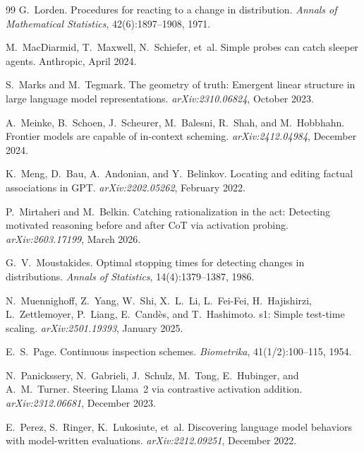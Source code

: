 \documentclass[11pt]{article}
\theoremstyle{definition}
\newcommand{\1}{\mathbf{1}}
\begin{document}
\begin{thebibliography}{99}
G.~Lorden.
\newblock Procedures for reacting to a change in distribution.
\newblock \emph{Annals of Mathematical Statistics}, 42(6):1897--1908, 1971.

M.~MacDiarmid, T.~Maxwell, N.~Schiefer, et~al.
\newblock Simple probes can catch sleeper agents.
\newblock Anthropic, April 2024.

S.~Marks and M.~Tegmark.
\newblock The geometry of truth: Emergent linear structure in large language model representations.
\newblock \emph{arXiv:2310.06824}, October 2023.

A.~Meinke, B.~Schoen, J.~Scheurer, M.~Balesni, R.~Shah, and M.~Hobbhahn.
\newblock Frontier models are capable of in-context scheming.
\newblock \emph{arXiv:2412.04984}, December 2024.

K.~Meng, D.~Bau, A.~Andonian, and Y.~Belinkov.
\newblock Locating and editing factual associations in GPT.
\newblock \emph{arXiv:2202.05262}, February 2022.

P.~Mirtaheri and M.~Belkin.
\newblock Catching rationalization in the act: Detecting motivated reasoning before and after CoT via activation probing.
\newblock \emph{arXiv:2603.17199}, March 2026.

G.~V.~Moustakides.
\newblock Optimal stopping times for detecting changes in distributions.
\newblock \emph{Annals of Statistics}, 14(4):1379--1387, 1986.

N.~Muennighoff, Z.~Yang, W.~Shi, X.~L.~Li, L.~Fei-Fei, H.~Hajishirzi, L.~Zettlemoyer, P.~Liang, E.~Cand\`es, and T.~Hashimoto.
\newblock s1: Simple test-time scaling.
\newblock \emph{arXiv:2501.19393}, January 2025.

E.~S.~Page.
\newblock Continuous inspection schemes.
\newblock \emph{Biometrika}, 41(1/2):100--115, 1954.

N.~Panickssery, N.~Gabrieli, J.~Schulz, M.~Tong, E.~Hubinger, and A.~M.~Turner.
\newblock Steering Llama~2 via contrastive activation addition.
\newblock \emph{arXiv:2312.06681}, December 2023.

E.~Perez, S.~Ringer, K.~Lukosiute, et~al.
\newblock Discovering language model behaviors with model-written evaluations.
\newblock \emph{arXiv:2212.09251}, December 2022.


\end{thebibliography}
\end{document}
